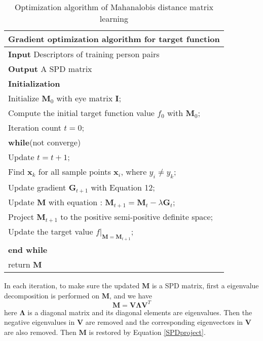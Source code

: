 \begin{table}[H] 

 \centering
 \caption{Optimization algorithm of Mahanalobis distance matrix learning}
 \label{Gradientdemo}
 \begin{tabular}{l}
 \hline 
 \multicolumn{1}{l}{\textbf{Gradient optimization algorithm for target function}} \\
 \hline
 \textbf{Input} Descriptors of training person pairs \\
 \textbf{Output} A SPD matrix\\
 \textbf{Initialization} \\
 Initialize $\bm{M}_0$ with eye matrix $\bm{I}$; \\
 Compute the initial target function value $f_0$ with $\bm{M}_0$;\\
 Iteration count  $t = 0$;\\

 \textbf{while}(not converge)\\
 \hspace{0.5cm} Update $t =  t + 1$;\\
 \hspace{0.5cm}  Find $\bm{x}_k$ for all sample points $\bm{x}_i$, where $y_i \ne y_k$;\\
 \hspace{0.5cm} Update gradient $\bm{G}_{t+1}$ with Equation 12;\\
 \hspace{0.5cm}  Update $\bm{M}$ with equation : $\bm{M}_{t+1} = \bm{M}_{t} - \lambda\bm{G}_t$;\\
 \hspace{0.5cm}  Project $\bm{M}_{t+1}$ to the positive semi-positive definite space; \\ 
 \hspace{0.5cm}  Update the target value $f|_{\bm{M} = \bm{M}_{t+1}}$;\\
 \textbf{end while}  \\
 return $\bm{M}$\\
 \hline
 \end{tabular} 
 \end{table}

In each iteration, to make sure the updated $\bm{M}$ is a SPD matrix, first a eigenvalue decomposition is performed on $\bm{M}$, and we have
\begin{equation}\label{SPDproject}
\bm{M} = \bm{V}\bm{\Lambda}\bm{V}^T
\end{equation}
here $\bm{\Lambda}$ is a diagonal matrix and its diagonal elements are eigenvalues. Then the negative eigenvalues in $\bm{V}$ are removed and the corresponding eigenvectors in $\bm{V}$ are also removed. Then $\bm{M}$ is restored by Equation \eqref{SPDproject}.

 
 
 
 
 
